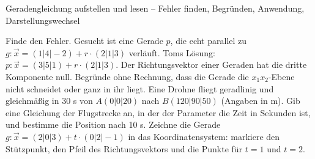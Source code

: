 \begin{aufgabe}{Geradengleichung aufstellen und lesen – Fehler finden, Begründen, Anwendung, Darstellungswechsel}
\begin{teile}
\teil Finde den Fehler. Gesucht ist eine Gerade $p$, die echt parallel zu $g\colon \vec x = (1 | 4 | -2) + r \cdot (2 | 1 | 3)$ verläuft. Toms Lösung: $p\colon \vec x = (3 | 5 | 1) + r \cdot (2 | 1 | 3)$.
\teil Der Richtungsvektor einer Geraden hat die dritte Komponente null. Begründe ohne Rechnung, dass die Gerade die $x_1x_2$-Ebene nicht schneidet oder ganz in ihr liegt.
\teil Eine Drohne fliegt geradlinig und gleichmäßig in 30 s von $A(0 | 0 | 20)$ nach $B(120 | 90 | 50)$ (Angaben in m). Gib eine Gleichung der Flugstrecke an, in der der Parameter die Zeit in Sekunden ist, und bestimme die Position nach 10 s.
\teil Zeichne die Gerade $g\colon \vec x = (2 | 0 | 3) + t \cdot (0 | 2 | -1)$ in das Koordinatensystem: markiere den Stützpunkt, den Pfeil des Richtungsvektors und die Punkte für $t = 1$ und $t = 2$.

\begin{ksys3}\end{ksys3}
\end{teile}
\end{aufgabe}
